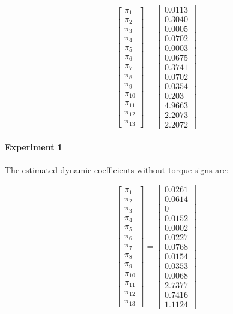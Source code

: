 \documentclass{article}
\begin{document}
\[\begin{bmatrix}
\pi_1 \\ \pi_2 \\ \pi_3 \\ \pi_4 \\ \pi_5 \\ \pi_6 \\ \pi_7 \\ \pi_8 \\  \pi_9 \\ \pi_{10} \\ \pi_{11} \\ \pi_{12} \\ \pi_{13}
\end{bmatrix}=\begin{bmatrix}
0.0113 \\ 0.3040 \\ 0.0005 \\ 0.0702 \\ 0.0003 \\ 0.0675 \\ 0.3741 \\ 0.0702 \\ 0.0354 \\ 0.203 \\ 4.9663 \\ 2.2073 \\ 2.2072
\end{bmatrix}\]

\paragraph{Experiment 1} The estimated dynamic coefficients without torque signs are:

\[\begin{bmatrix}
\pi_1 \\ \pi_2 \\ \pi_3 \\ \pi_4 \\ \pi_5 \\ \pi_6 \\ \pi_7 \\ \pi_8 \\  \pi_9 \\ \pi_{10} \\ \pi_{11} \\ \pi_{12} \\ \pi_{13}
\end{bmatrix}=\begin{bmatrix}
0.0261 \\ 0.0614 \\ 0 \\ 0.0152 \\ 0.0002 \\ 0.0227 \\ 0.0768 \\ 0.0154 \\ 0.0353 \\ 0.0068 \\ 2.7377 \\ 0.7416 \\ 1.1124
\end{bmatrix}\]
\end{document}

